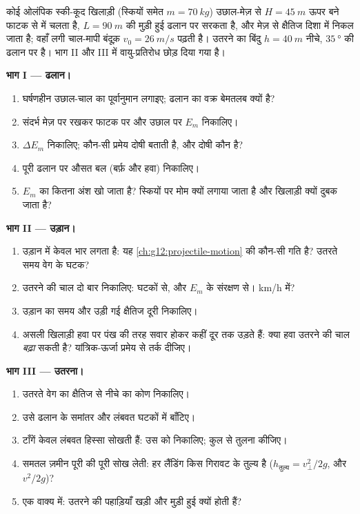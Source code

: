 \begin{problem}
\label{pb:g12:work-and-energy:1}
कोई ओलंपिक स्की-कूद खिलाड़ी (स्कियों समेत $m = \qty{70}{kg}$) उछाल-मेज़ से $H = \qty{45}{m}$ ऊपर
बने फाटक से  में चलता है, $L = \qty{90}{m}$ की मुड़ी हुई ढलान पर सरकता है, और मेज़
से क्षैतिज दिशा में निकल जाता है; वहाँ लगी चाल-मापी बंदूक़ $v_0 = \qty{26}{m/s}$ पढ़ती है।
उतरने का बिंदु $h = \qty{40}{m}$ नीचे, $\qty{35}{\degree}$ की ढलान पर है। भाग II और III में
वायु-प्रतिरोध छोड़ दिया गया है।

\medskip\noindent\textbf{भाग I --- ढलान।}
\begin{enumerate}
  \item घर्षणहीन उछाल-चाल का पूर्वानुमान लगाइए; ढलान का वक्र बेमतलब क्यों है?
  \item संदर्भ मेज़ पर रखकर फाटक पर और उछाल पर $E_m$ निकालिए।
  \item $\Delta E_m$ निकालिए; कौन-सी प्रमेय दोषी बताती है, और दोषी कौन है?
  \item पूरी ढलान पर औसत  बल (बर्फ़ और हवा) निकालिए।
  \item $E_m$ का कितना अंश खो जाता है? स्कियों पर मोम क्यों लगाया जाता है
        और खिलाड़ी क्यों दुबक जाता है?
\end{enumerate}

\medskip\noindent\textbf{भाग II --- उड़ान।}
\begin{enumerate}[resume]
  \item उड़ान में केवल भार लगता है: यह \cref{ch:g12:projectile-motion} की कौन-सी गति है?
        उतरते समय वेग के घटक?
  \item उतरने की चाल दो बार निकालिए: घटकों से, और $E_m$ के संरक्षण से।
        \unit{km/h} में?
  \item उड़ान का समय और उड़ी गई क्षैतिज दूरी निकालिए।
  \item असली खिलाड़ी हवा पर पंख की तरह सवार होकर कहीं दूर तक उड़ते हैं: क्या
        हवा उतरने की चाल \emph{बढ़ा} सकती है? यांत्रिक-ऊर्जा प्रमेय
        से तर्क दीजिए।
\end{enumerate}

\medskip\noindent\textbf{भाग III --- उतरना।}
\begin{enumerate}[resume]
  \item उतरते वेग का क्षैतिज से नीचे का कोण निकालिए।
  \item उसे ढलान के समांतर और लंबवत घटकों में बाँटिए।
  \item टाँगें केवल लंबवत हिस्सा सोखती हैं: उस  को निकालिए;
        कुल से तुलना कीजिए।
  \item समतल ज़मीन पूरी की पूरी सोख लेती: हर लैंडिंग किस  गिरावट के
        तुल्य है ($h_{\text{तुल्य}} = v_\perp^2/2g$, और $v^2/2g$)?
  \item एक वाक्य में: उतरने की पहाड़ियाँ खड़ी और मुड़ी हुई क्यों होती हैं?
\end{enumerate}


\end{problem}
